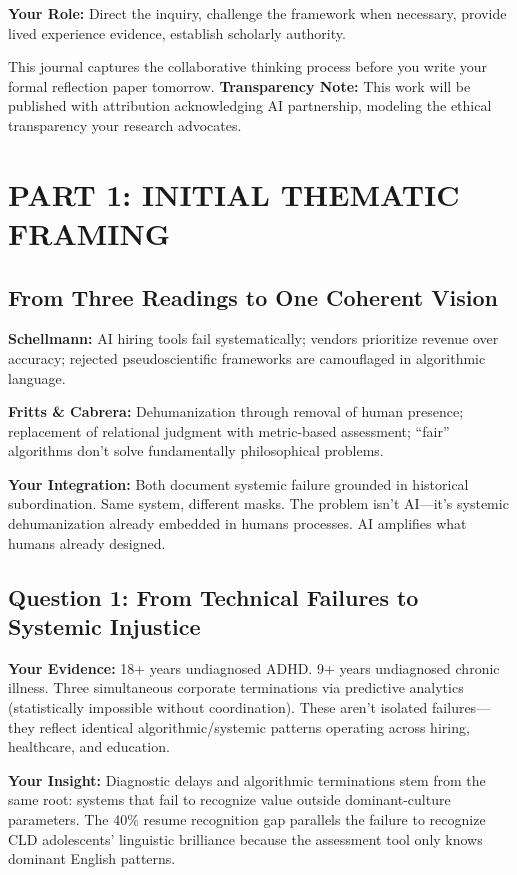 \documentclass[12pt,letterpaper]{article}
\begin{document}
\textbf{Your Role:} Direct the inquiry, challenge the framework when necessary, provide lived experience evidence, establish scholarly authority.

\noindent This journal captures the collaborative thinking process before you write your formal reflection paper tomorrow. \textbf{Transparency Note:} This work will be published with attribution acknowledging AI partnership, modeling the ethical transparency your research advocates.

\newpage

\section{PART 1: INITIAL THEMATIC FRAMING}

\subsection{From Three Readings to One Coherent Vision}

\begin{keyfindings}
\textbf{Schellmann:} AI hiring tools fail systematically; vendors prioritize revenue over accuracy; rejected pseudoscientific frameworks are camouflaged in algorithmic language.

\textbf{Fritts \& Cabrera:} Dehumanization through removal of human presence; replacement of relational judgment with metric-based assessment; ``fair'' algorithms don't solve fundamentally philosophical problems.

\textbf{Your Integration:} Both document systemic failure grounded in historical subordination. Same system, different masks. The problem isn't AI—it's systemic dehumanization already embedded in humans processes. AI amplifies what humans already designed.
\end{keyfindings}

\subsection{Question 1: From Technical Failures to Systemic Injustice}

\begin{livedexperience}
\textbf{Your Evidence:} 18+ years undiagnosed ADHD. 9+ years undiagnosed chronic illness. Three simultaneous corporate terminations via predictive analytics (statistically impossible without coordination). These aren't isolated failures—they reflect identical algorithmic/systemic patterns operating across hiring, healthcare, and education.

\textbf{Your Insight:} Diagnostic delays and algorithmic terminations stem from the same root: systems that fail to recognize value outside dominant-culture parameters. The 40\% resume recognition gap parallels the failure to recognize CLD adolescents' linguistic brilliance because the assessment tool only knows dominant English patterns.
\end{livedexperience}
\end{document}

